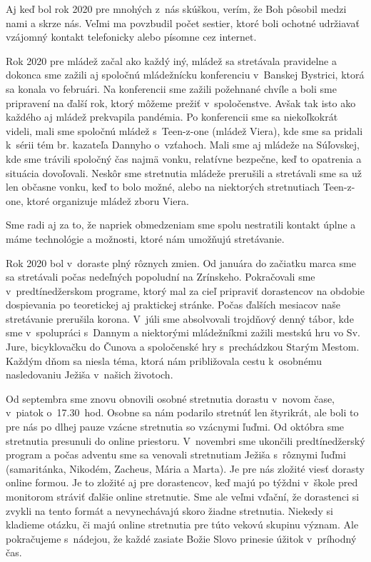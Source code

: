 Aj keď bol rok 2020 pre mnohých z~nás skúškou, verím, že Boh pôsobil medzi nami a skrze nás. Veľmi ma povzbudil počet sestier, ktoré boli ochotné udržiavať vzájomný kontakt telefonicky alebo písomne cez internet.



Rok 2020 pre mládež začal ako každý iný, mládež sa stretávala pravidelne a dokonca sme zažili aj spoločnú mládežnícku konferenciu v~Banskej Bystrici, ktorá sa konala vo februári. Na konferencii sme zažili požehnané chvíle a boli sme pripravení na ďalší rok, ktorý môžeme prežiť v~spoločenstve. Avšak tak isto ako každého aj mládež prekvapila pandémia. Po konferencii sme sa niekoľkokrát videli, mali sme spoločnú mládež s~Teen-z-one (mládež Viera), kde sme sa pridali k~sérii tém br. kazateľa Dannyho o~vzťahoch. Mali sme aj mládeže na Súľovskej, kde sme trávili spoločný čas najmä vonku, relatívne bezpečne, keď to opatrenia a situácia dovoľovali. Neskôr sme stretnutia mládeže prerušili a stretávali sme sa už len občasne vonku, keď to bolo možné, alebo na niektorých stretnutiach Teen-z-one, ktoré organizuje mládež zboru Viera.

Sme radi aj za to, že napriek obmedzeniam sme spolu nestratili kontakt úplne a máme technológie a možnosti, ktoré nám umožňujú stretávanie.



Rok 2020 bol v~doraste plný rôznych zmien. Od januára do začiatku marca sme sa stretávali počas nedeľných popoludní na Zrínskeho. Pokračovali sme v~predtínedžerskom programe, ktorý mal za cieľ pripraviť dorastencov na obdobie dospievania po teoretickej aj praktickej stránke. Počas ďalších mesiacov naše stretávanie prerušila korona. V~júli sme absolvovali trojdňový denný tábor, kde sme v~spolupráci s~Dannym a niektorými mládežníkmi zažili mestskú hru vo Sv. Jure, bicyklovačku do Čunova a spoločenské hry s~prechádzkou Starým Mestom. Každým dňom sa niesla téma, ktorá nám približovala cestu k~osobnému nasledovaniu Ježiša v~našich životoch.

Od septembra sme znovu obnovili osobné stretnutia dorastu v~novom čase, v~piatok o~17.30~hod. Osobne sa nám podarilo stretnúť len štyrikrát, ale boli to pre nás po dlhej pauze vzácne stretnutia so vzácnymi ľuďmi. Od októbra sme stretnutia presunuli do online priestoru. V~novembri sme ukončili predtínedžerský program a počas adventu sme sa venovali  stretnutiam Ježiša s~rôznymi ľuďmi (samaritánka, Nikodém, Zacheus, Mária a Marta). Je pre nás zložité viesť dorasty online formou. Je to zložité aj pre dorastencov, keď majú po týždni v~škole pred monitorom stráviť ďalšie online stretnutie. Sme ale veľmi vďační, že dorastenci si zvykli na tento formát a nevynechávajú skoro žiadne stretnutia. Niekedy si kladieme otázku, či majú online stretnutia pre túto vekovú skupinu význam. Ale pokračujeme s~nádejou, že každé zasiate Božie Slovo prinesie úžitok v~príhodný čas.


